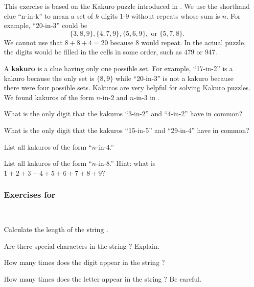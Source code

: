 \begin{exer}[\exerE]%
\label{exer_explore_kakuro}
   This exercise is based on the Kakuro puzzle introduced in .  We use the shorthand clue ``n-in-k'' to mean a set of $k$ digits 1-9 without repeats whose sum is $n$. For example, ``20-in-3'' could be 
   $$\{3, 8, 9\}, \{4, 7, 9\},  \{5, 6, 9\}, \text{ or } \{5,7,8\}.$$ We cannot use that $8 + 8 + 4 = 20$ because $8$ would repeat. In the actual puzzle, the digits would be filled in the cells in some order, such as 479 or 947. 
   
   A \textbf{kakuro} is a clue having only one possible set. For example, ``17-in-2'' is a kakuro because the only set is $\{8,9\}$ while ``20-in-3'' is not a kakuro because there were four possible sets.  Kakuros are very helpful for solving Kakuro puzzles.  We found kakuros of the form $n$-in-2 and $n$-in-3 in .
       \begin{exerpart}
           \item What is the only digit that the kakuros ``3-in-2'' and ``4-in-2'' have in common?
           \item What is the only digit that the kakuros ``15-in-5'' and ``29-in-4'' have in common?
           \item List all kakuros of the form ``$n$-in-4.''
           \item List all kakuros of the form ``$n$-in-8.''  Hint: what is $1+2+3+4+5+6+7+8+9$?
       \end{exerpart}
\end{exer}


\subsubsection*{Exercises for  \substrings} 

\begin{exer} [\exerP]%
\label{exer_string_vocab}
~
    \begin{exerpart}
        \item Calculate the length of the string .
        \item Are there special characters in the string ?  Explain.
        \item How many times does the digit  appear in the string ?
        \item How many times does the letter  appear in the string ?  Be careful.
    \end{exerpart}
\end{exer}

